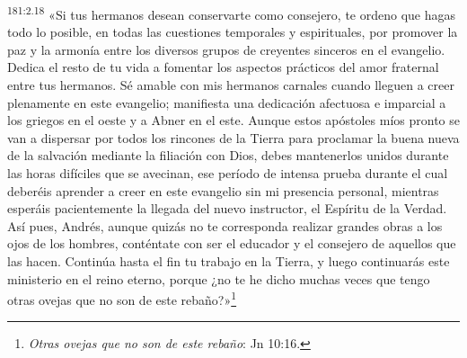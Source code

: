 \par
\textsuperscript{181:2.18} «Si tus hermanos desean conservarte como consejero, te ordeno que hagas todo lo posible, en todas las cuestiones temporales y espirituales, por promover la paz y la armonía entre los diversos grupos de creyentes sinceros en el evangelio. Dedica el resto de tu vida a fomentar los aspectos prácticos del amor fraternal entre tus hermanos. Sé amable con mis hermanos carnales cuando lleguen a creer plenamente en este evangelio; manifiesta una dedicación afectuosa e imparcial a los griegos en el oeste y a Abner en el este. Aunque estos apóstoles míos pronto se van a dispersar por todos los rincones de la Tierra para proclamar la buena nueva de la salvación mediante la filiación con Dios, debes mantenerlos unidos durante las horas difíciles que se avecinan, ese período de intensa prueba durante el cual deberéis aprender a creer en este evangelio sin mi presencia personal, mientras esperáis pacientemente la llegada del nuevo instructor, el Espíritu de la Verdad. Así pues, Andrés, aunque quizás no te corresponda realizar grandes obras a los ojos de los hombres, conténtate con ser el educador y el consejero de aquellos que las hacen. Continúa hasta el fin tu trabajo en la Tierra, y luego continuarás este ministerio en el reino eterno, porque ¿no te he dicho muchas veces que tengo otras ovejas que no son de este rebaño?»\footnote{\textit{Otras ovejas que no son de este rebaño}: Jn 10:16.}

